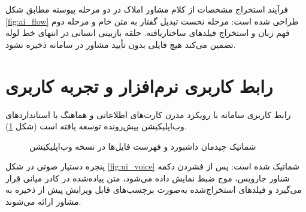 \documentclass[11pt, a4paper]{report}
\begin{document}
فرآیند استخراج مشخصات از کلام مشاور املاک در دو مرحله پیوسته مطابق شکل \ref{fig:ai_flow} طراحی شده است: مرحله نخست تبدیل گفتار به متن خام و مرحله دوم فهم زبان و استخراج فیلدهای ساختاریافته. حلقه بازبینی انسانی در انتهای خط لوله تضمین می‌کند هیچ فایلی بدون تأیید مشاور در سامانه ذخیره نشود.

\section{رابط کاربری نرم‌افزار و تجربه کاربری}
رابط کاربری سامانه با رویکرد مدرن کارت‌های اطلاعاتی و هماهنگ با استانداردهای وب‌اپلیکیشن پیش‌رونده توسعه یافته است (شکل \ref{fig:ui_dashboard}).

\begin{figure}[htbp]
  \centering
  \caption{شماتیک چیدمان داشبورد و فهرست فایل‌ها در نسخه وب‌اپلیکیشن}
  \label{fig:ui_dashboard}
\end{figure}

پنجره دستیار صوتی در شکل \ref{fig:ui_voice} شماتیک شده است: پس از فشردن دکمه شناور جارویس، موج ضبط نمایش داده می‌شود، متن پیاده‌شده در کادر میانی قرار می‌گیرد و فیلدهای استخراج‌شده به‌صورت برچسب‌های قابل ویرایش پیش از ذخیره به مشاور ارائه می‌شوند.
\end{document}
